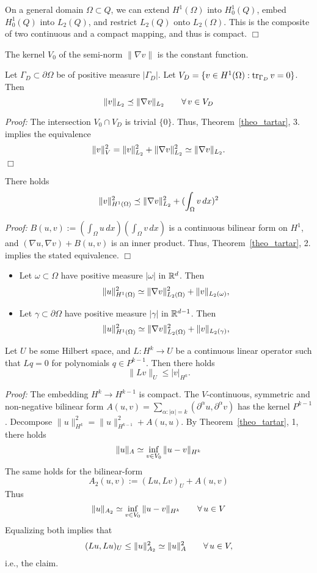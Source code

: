 On a general domain $\Omega \subset Q$, we can extend $H^1(\Omega)$ 
into $H_0^1(Q)$, embed $H_0^1(Q)$ into $L_2(Q)$, and restrict $L_2(Q)$
onto $L_2(\Omega)$. This is the composite of two continuous and a compact
mapping, and thus is compact.
\hfill $\Box$

\bigskip
\noindent

The kernel $V_0$ of the semi-norm $\| \nabla v \|$ is the constant function.

\begin{theorem} 
Let $\Gamma_D \subset \partial \Omega$ be of positive measure $|\Gamma_D|$.
Let $V_D = \{ v \in H^1(\Omega) : \operatorname{tr}_{\Gamma_D} v = 0 \}$. Then
$$
\| v \|_{L_2} \preceq \| \nabla v \|_{L_2} \qquad \forall \, v \in V_D
$$
\end{theorem}
{\em Proof:} The intersection $V_0 \cap V_D$ is trivial $\{ 0 \}$. 
Thus, Theorem~\ref{theo_tartar}, 3. implies the equivalence  
$$
\| v \|_V^2 = \| v \|_{L_2}^2 + \| \nabla v \|_{L_2}^2 \simeq
\| \nabla v \|_{L_2}.
$$
\hfill $\Box$


\begin{theorem} 
There holds
$$
\| v \|_{H^1(\Omega)}^2 \preceq \| \nabla v \|_{L_2}^2 + (\int_\Omega v \, dx)^2
$$
\end{theorem}
{\em Proof:} $B(u,v) := (\int_\Omega u \, dx) (\int_\Omega v \, dx)$ is
a continuous bilinear form on $H^1$, and $(\nabla u, \nabla v) + B(u,v)$ is
an inner product. Thus, Theorem~\ref{theo_tartar}, 2. implies the 
stated equivalence.
\hfill $\Box$

\begin{itemize}
\item
Let $\omega \subset \Omega$ have positive measure $| \omega|$ in ${\mathbb R}^d$.
Then
$$
\| u \|_{H^1(\Omega)}^2 \simeq
 \| \nabla v \|_{L_2(\Omega)}^2 + \| v \|_{L_2(\omega)},
$$
\item
Let $\gamma \subset \partial \Omega$ have positive measure $| \gamma|$ in ${\mathbb R}^{d-1}$. Then
$$
\| u \|_{H^1(\Omega)}^2 \simeq
\| \nabla v \|_{L_2(\Omega)}^2 + \| v \|_{L_2(\gamma)},
$$
\end{itemize}


\begin{theorem} \label{lemma_bh} 
Let $U$ be some Hilbert space, and
$L : H^k \rightarrow U$ be a continuous linear operator such that 
$L q = 0$ for polynomials $q \in P^{k-1}$. Then there holds
$$
\| L v \|_U \leq | v |_{H^k}.
$$
\end{theorem}
{\em Proof:} The embedding $H^k \rightarrow H^{k-1}$ is compact. 
The $V$-continuous, symmetric and non-negative bilinear form
$A(u,v) = \sum_{\alpha : | \alpha | = k} (\partial^\alpha u, \partial^\alpha v)$ has the kernel $P^{k-1}$. Decompose $\| u \|_{H^k}^2 = \| u \|_{H^{k-1}}^2 + A(u,u)$. By Theorem~\ref{theo_tartar}, 1, there holds
$$
\| u \|_A \simeq \inf_{v \in V_0} \| u - v \|_{H^k}
$$
The same holds for the bilinear-form
$$
A_2(u,v) := (L u, Lv)_U + A(u,v)
$$
Thus
$$
\| u \|_{A_2} \simeq  \inf_{v \in V_0} \| u - v \|_{H^k} \qquad \forall \, u \in V
$$
Equalizing both  implies that
$$
(L u, Lu)_U \leq \| u \|_{A_2}^2 \simeq \| u \|_A^2  \qquad \forall \, u \in V,
$$
i.e., the claim.

